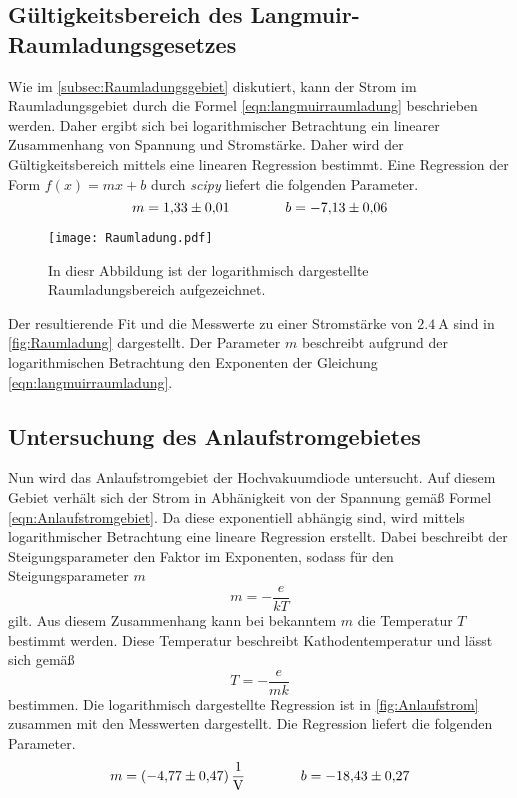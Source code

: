 \subsection{Gültigkeitsbereich des Langmuir-Raumladungsgesetzes}
\label{subsec:Raumladung}
Wie im \autoref{subsec:Raumladungsgebiet} diskutiert, kann der Strom im Raumladungsgebiet durch die Formel \eqref{eqn:langmuirraumladung} beschrieben werden. Daher ergibt sich
bei logarithmischer Betrachtung ein linearer Zusammenhang von Spannung und Stromstärke. Daher wird der Gültigkeitsbereich mittels eine linearen Regression bestimmt. 
Eine Regression der Form $f(x) = mx+b$ durch \textit{scipy}\cite{scipy} liefert die folgenden Parameter.
\begin{equation*}
  m = \num{1.33 +- 0.01} \quad\quad\quad\quad b = \num{-7.13 +- 0.06}
\end{equation*}

\begin{figure}
  \centering
  \texttt{[image: Raumladung.pdf]}
  \caption{In diesr Abbildung ist der logarithmisch dargestellte Raumladungsbereich aufgezeichnet.}
  \label{fig:Raumladung}
\end{figure}

Der resultierende Fit und die Messwerte zu einer Stromstärke von $\qty{2.4}{\ampere}$ sind in \autoref{fig:Raumladung} dargestellt.
Der Parameter $m$ beschreibt aufgrund der logarithmischen Betrachtung den Exponenten der Gleichung \eqref{eqn:langmuirraumladung}. 

\subsection{Untersuchung des Anlaufstromgebietes}
\label{subsec:Anlaufstromgebiet}
Nun wird das Anlaufstromgebiet der Hochvakuumdiode untersucht. Auf diesem Gebiet verhält sich der Strom in Abhänigkeit von der Spannung gemäß Formel \eqref{eqn:Anlaufstromgebiet}.
Da diese exponentiell abhängig sind, wird mittels logarithmischer Betrachtung eine lineare Regression erstellt. Dabei beschreibt der Steigungsparameter den Faktor im Exponenten,
sodass für den Steigungsparameter $m$
\begin{equation*}
  m = -\frac{e}{kT}
\end{equation*}    
gilt. Aus diesem Zusammenhang kann bei bekanntem $m$ die Temperatur $T$ bestimmt werden. Diese Temperatur beschreibt Kathodentemperatur und lässt sich gemäß
\begin{equation}
  \label{eqn:ATemperatur}
  T = -\frac{e}{mk}
\end{equation}
bestimmen. 
Die logarithmisch dargestellte Regression ist in \autoref{fig:Anlaufstrom} zusammen mit den Messwerten dargestellt. Die Regression liefert die folgenden Parameter.
\begin{equation*}
  m=\qty{-4.77 +- 0.47}{\per\volt} \quad\quad\quad\quad b = \num{-18.43 +- 0.27}
\end{equation*}

